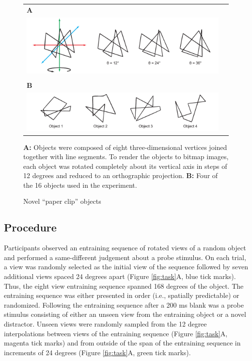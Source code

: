 \documentclass[dwyatte_dissertation.tex]{subfiles}
\begin{document}
\begin{figure}[h!]
\begin{center}
\begin{tabular}{ll}
\textbf{A} \\
\includegraphics[width=160mm]{figs/pleast/paperclip_rots.pdf} \\
\vspace{5mm} \\
\textbf{B} \\
\includegraphics[width=160mm]{figs/pleast/paperclip_objs.pdf} \\
\end{tabular}
\end{center}
\caption{Novel ``paper clip'' objects}{\textbf{A:} Objects were composed of eight three-dimensional vertices joined together with line segments. To render the objects to bitmap images, each object was rotated completely about its vertical axis in steps of 12 degrees and reduced to an orthographic projection. \textbf{B:} Four of the 16 objects used in the experiment.}
\label{fig:paperclip}
\end{figure}

\subsection{Procedure}
Participants observed an entraining sequence of rotated views of a random object and performed a same-different judgement about a probe stimulus. On each trial, a view was randomly selected as the initial view of the sequence followed by seven additional views spaced 24 degrees apart (Figure \ref{fig:task}A, blue tick marks). Thus, the eight view entraining sequence spanned 168 degrees of the object. The entraining sequence was either presented in order (i.e., spatially predictable) or randomized. Following the entraining sequence after a 200 ms blank was a probe stimulus consisting of either an unseen view from the entraining object or a novel distractor. Unseen views were randomly sampled from the 12 degree interpolations between views of the entraining sequence (Figure \ref{fig:task}A, magenta tick marks) and from outside of the span of the entraining sequence in increments of 24 degrees (Figure \ref{fig:task}A, green tick marks).
\end{document}
